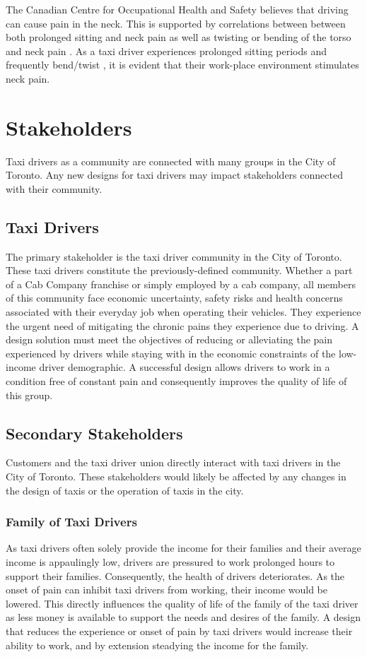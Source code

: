 \documentclass[11pt]{article}
\begin{document}
The Canadian Centre for Occupational Health and Safety believes that driving can cause pain in the 
neck\cite{proof}. This is supported by correlations between between both prolonged sitting and neck pain as well as  
twisting or bending of the torso and neck pain \cite{neck}. 
As a taxi driver experiences prolonged sitting periods and frequently bend/twist \cite{Okunribido2008, POSTULATED},
it is evident that their work-place environment stimulates neck pain. 

\section{Stakeholders}
\label{sec:stake}
Taxi drivers as a community are connected with many groups in the City
of Toronto. Any new designs for taxi drivers may impact
stakeholders connected with their community.
 
\subsection{Taxi Drivers}
The primary stakeholder is the taxi driver community in the City of
Toronto. These taxi drivers constitute the previously-defined community. 
Whether a part of a Cab Company franchise or simply employed by a cab company, 
all members of this community face economic uncertainty, safety risks and health 
concerns associated with their everyday job when operating their vehicles. They 
experience the urgent need of mitigating the chronic pains they experience due 
to driving. A design solution must meet the objectives of reducing or 
alleviating the pain experienced by drivers while staying with in the 
economic constraints of the low-income driver demographic. A successful
design allows drivers to work in a condition free of constant pain and 
consequently improves the quality of life of this group. 
 
\subsection{Secondary Stakeholders} 
Customers and the taxi driver union directly interact with taxi 
drivers in the City of Toronto. These stakeholders would likely be 
affected by any changes in the design of taxis or the operation of taxis 
in the city. 

\subsubsection{Family of Taxi Drivers}
As taxi drivers often solely provide the 
income for their families and their average income is appaulingly low, drivers are pressured to work prolonged hours to support their families. Consequently, the health of drivers deteriorates. 
As the onset of pain can inhibit taxi drivers from working, their income would be lowered. This directly influences 
the quality of life of the family of the taxi driver as less money is available to support the needs and desires of the family. A design that
reduces the experience or onset of pain by taxi drivers would increase their ability 
to work, and by extension steadying the income for the family. 
\end{document}

